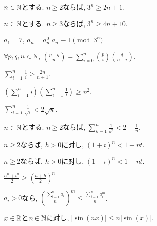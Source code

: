 \begin{prop}
$n\in\mathbb{N}$とする.
  $n\geq 2$ならば, $3^n \geq 2n+1$.
\end{prop}

\begin{prop}
$n\in\mathbb{N}$とする.
  $n\geq 3$ならば, $3^n\geq 4n+10$.
\end{prop}





\begin{prop}
  $a_1=7$, $a_{n}=a_{n}^3$
  $a_n\equiv 1\pmod{3^n}$
\end{prop}


\begin{prop}
  $\forall p,q,n\in\mathbb{N}$,
  $\binom{p+q}{n}=\sum_{i=0}^n\binom{p}{i}\binom{q}{n-i}$.
\end{prop}



\begin{prop}
$\sum_{i=1}^{n}\frac{1}{i}\geq \frac{2n}{n+1}$.
\end{prop}

\begin{prop}
$\left(\sum_{i=1}^{n}i\right)\left(\sum_{i=1}^{n}\frac{1}{i}\right)\geq n^2$.
\end{prop}

\begin{prop}
$\sum_{i=1}^{n}\frac{1}{\sqrt{i}}<2\sqrt{n}$.
\end{prop}

\begin{prop}
$n\in\mathbb{N}$とする.
  $n\geq 2$ならば, $\sum_{k=1}^n\frac{1}{k^2} < 2-\frac{1}{n}$.
\end{prop}

\begin{prop}
  $n\geq 2$ならば,  $h>0$に対し,
$(1+t)^n<1+nt$.
\end{prop}
\begin{prop}
  $n\geq 2$ならば,  $h>0$に対し,
$(1-t)^n<1-nt$.
\end{prop}

\begin{prop}
$\frac{a^n+b^n}{2}\geq \left(\frac{a+b}{2}\right)^n$
\end{prop}

\begin{prop}
  $a_i>0$なら,
  $\left(\frac{\sum_{i=1}^n a_i}{n}\right)^m \leq \frac{\sum_{i=1}^{n}a_i^m}{n}$.
\end{prop}

\begin{prop}
$x\in\mathbb{R}$と$n\in\mathbb{N}$に対し, $|\sin(nx)|\leq n|\sin(x)|$.
\end{prop}

